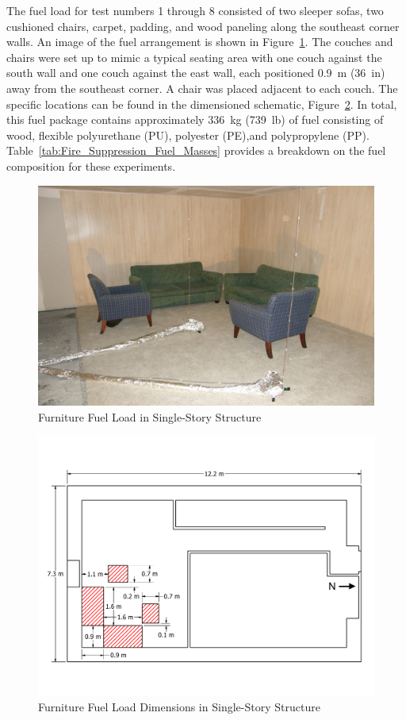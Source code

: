 \documentclass[12pt,oneside]{book}
\begin{document}
The fuel load for test numbers 1 through 8 consisted of two sleeper sofas, two cushioned chairs, carpet, padding, and wood paneling along the southeast corner walls. An image of the fuel arrangement is shown in Figure~\ref{fig:Furniture_Fuel_Load}. The couches and chairs were set up to mimic a typical seating area with one couch against the south wall and one couch against the east wall, each positioned 0.9~m (36~in) away from the southeast corner. A chair was placed adjacent to each couch. The specific locations can be found in the dimensioned schematic, Figure~\ref{fig:Furniture_Fuel_Load_Dimensions}. In total, this fuel package contains approximately 336~kg (739~lb) of fuel consisting of wood, flexible polyurethane (PU), polyester (PE),and polypropylene (PP). Table~\ref{tab:Fire_Suppression_Fuel_Masses} provides a breakdown on the fuel composition for these experiments.

\begin{figure}[!ht]
	\includegraphics[width=.8\columnwidth]{../Figures/Pictures/Furniture_Fuel_Load}
	\caption{Furniture Fuel Load in Single-Story Structure}
	\label{fig:Furniture_Fuel_Load}
\end{figure}

\begin{figure}[!ht]
	\includegraphics[width=.8\columnwidth]{../Figures/Floor_Plans/PDFs/East_Structure/DelCo_2012_East_Structure_Furniture}
	\caption{Furniture Fuel Load Dimensions in Single-Story Structure}
	\label{fig:Furniture_Fuel_Load_Dimensions}
\end{figure}
\end{document}
